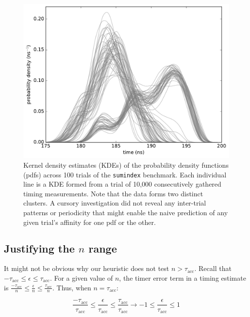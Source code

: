 \documentclass[conference]{IEEEtran}
\begin{document}
\begin{figure}
\centering
\includegraphics[width=\columnwidth]{figures/fig4/kde_pdf_sumindex}
\caption{Kernel density estimates (KDEs) of the probability density functions (pdfs)
across 100 trials of the \lstinline|sumindex| benchmark. Each individual line is
a KDE formed from a trial of 10,000 consecutively gathered timing measurements. Note that
the data forms two distinct clusters. A cursory investigation did not reveal any inter-trial
patterns or periodicity that might enable the naive prediction of any given trial's affinity
for one pdf or the other.}
\label{fig:pdfsumindex}
\end{figure}

\subsection{Justifying the $n$ range}

It might not be obvious why our heuristic does not test $n > \tau_{\textrm{acc}}$. Recall
that $-\tau_{\textrm{acc}} \le \epsilon \le \tau_{\textrm{acc}}$. For a given value of $n$,
the timer error term in a timing estimate is $\frac{-\tau_{\textrm{acc}}}{n} \le
\frac{\epsilon}{n} \le \frac{\tau_{\textrm{acc}}}{n}$. Thus, when $n = \tau_{\textrm{acc}}$:

\begin{equation}
\frac{-\tau_{\textrm{acc}}}{\tau_{\textrm{acc}}} \le \frac{\epsilon}{\tau_{\textrm{acc}}} \le \frac{\tau_{\textrm{acc}}}{\tau_{\textrm{acc}}} \to -1 \le \frac{\epsilon}{\tau_{\textrm{acc}}} \le 1
\end{equation}
\end{document}
